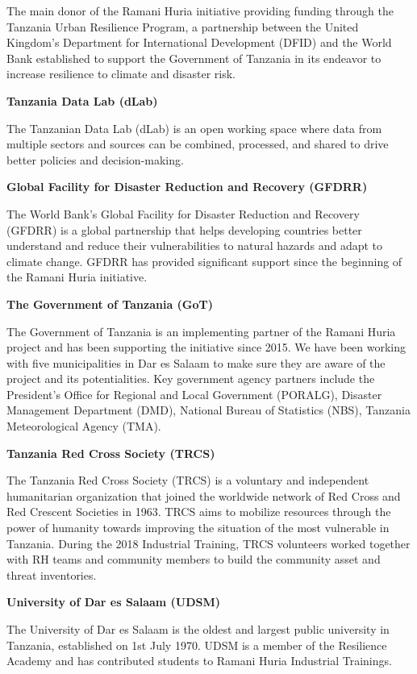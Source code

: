 \documentclass[a4paper,12pt,twoside]{article}
\begin{document}
The main donor of the Ramani Huria initiative providing funding through the Tanzania Urban Resilience Program, a partnership between the United Kingdom’s Department for International Development (DFID) and the World Bank established to support the Government of Tanzania in its endeavor to increase resilience to climate and disaster risk. 

\textbf{Tanzania Data Lab (dLab)}


The Tanzanian Data Lab (dLab) is an open working space where data from multiple sectors and sources can be combined, processed, and shared to drive better policies and decision-making. 

\textbf{Global Facility for Disaster Reduction and Recovery (GFDRR)}


The World Bank’s Global Facility for Disaster Reduction and Recovery (GFDRR) is a global partnership that helps developing countries better understand and reduce their vulnerabilities to natural hazards and adapt to climate change. GFDRR has provided significant support since the beginning of the Ramani Huria initiative.

\textbf{The Government of Tanzania (GoT)}


The Government of Tanzania is an implementing partner of the Ramani Huria project and has been supporting the initiative since 2015. We have been working with five municipalities in Dar es Salaam to make sure they are aware of the project and its potentialities. Key government agency partners include the President’s Office for Regional and Local Government (PORALG), Disaster Management Department (DMD), National Bureau of Statistics (NBS), Tanzania Meteorological Agency (TMA).

\textbf{Tanzania Red Cross Society (TRCS)} 


The Tanzania Red Cross Society (TRCS) is a voluntary and independent humanitarian organization that joined the worldwide network of Red Cross and Red Crescent Societies in 1963. TRCS aims to mobilize resources through the power of humanity towards improving the situation of the most vulnerable in Tanzania. During the 2018 Industrial Training, TRCS volunteers worked together with RH teams and community members to build the community asset and threat inventories.

\textbf{University of Dar es Salaam (UDSM)}


The University of Dar es Salaam is the oldest and largest public university in Tanzania, established on 1st July 1970. UDSM is a member of the Resilience Academy and has contributed students to Ramani Huria Industrial Trainings. 
\end{document}
